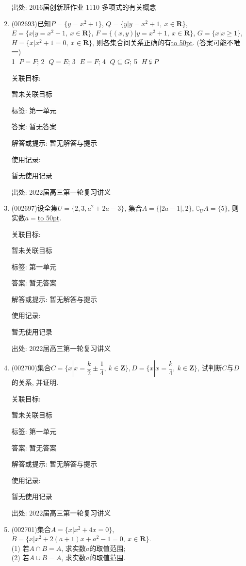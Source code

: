 \documentclass[10pt,a4paper]{article}
\newcommand{\blank}[1]{\underline{\hbox to #1pt{}}}
\begin{document}
\begin{enumerate}[1.]
出处: 2016届创新班作业	1110-多项式的有关概念
\item { (002693)}已知$P=\{y=x^2+1\}$, $Q=\{y|y=x^2+1, \ x\in \mathbf{R}\}$, $E=\{x|y=x^2+1, \  x\in \mathbf{R}\}$, $F=\{(x,y)|y=x^2+1, \ x\in \mathbf{R}\}$, $G=\{x|x\ge 1\}$, $H=\{x|x^2+1=0, \ x\in \mathbf{R}\}$, 则各集合间关系正确的有\blank{50}. (答案可能不唯一)\\
\textcircled{1} $P=F$; \textcircled{2} $Q=E$; \textcircled{3} $E=F$; \textcircled{4} $Q\subseteq G$; \textcircled{5} $H\subsetneqq P$


关联目标:

暂未关联目标



标签: 第一单元

答案: 暂无答案

解答或提示: 暂无解答与提示

使用记录:

暂无使用记录


出处: 2022届高三第一轮复习讲义
\item { (002697)}设全集$U=\{2,3,a^2+2a-3\}$, 集合$A=\{|2a-1|,2\}$, $\complement_U A=\{5\}$, 则实数$a=$\blank{50}.


关联目标:

暂未关联目标



标签: 第一单元

答案: 暂无答案

解答或提示: 暂无解答与提示

使用记录:

暂无使用记录


出处: 2022届高三第一轮复习讲义
\item { (002700)}集合$C=\{x|x=\dfrac k2\pm \dfrac14, \ k\in \mathbf{Z}\},D=\{x|x=\dfrac k4,\ k\in \mathbf{Z}\}$, 试判断$C$与$D$的关系, 并证明.


关联目标:

暂未关联目标



标签: 第一单元

答案: 暂无答案

解答或提示: 暂无解答与提示

使用记录:

暂无使用记录


出处: 2022届高三第一轮复习讲义
\item { (002701)}集合$A=\{x|x^2+4x=0\}$, $B=\{x|x^2+2(a+1)x+a^2-1=0,\ x\in \mathbf{R}\}$.\\
(1) 若$A\cap B=A$, 求实数$a$的取值范围;\\
(2) 若$A\cup B=A$, 求实数$a$的取值范围.



\end{enumerate}
\end{document}

